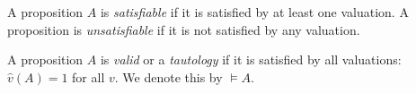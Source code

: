 

\setcounter{section}{1}
\setcounter{subsection}{3}
\setcounter{dfn}{5}

\begin{dfn}
A proposition $A$ is \emph{satisfiable} if it is satisfied by at least one valuation.
A proposition is \emph{unsatisfiable} if it is not satisfied by any valuation.

A proposition $A$ is \emph{valid} or a \emph{tautology} if it is satisfied by all valuations: $\hat{v}(A) = 1$ for all $v$.
We denote this by $\vDash A$.
\end{dfn}

